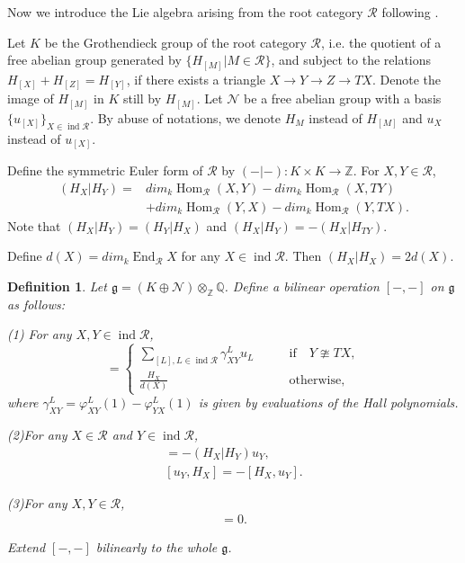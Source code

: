 \documentclass[12pt]{amsart}
\newtheorem{definition}[theorem]{Definition}
\begin{document}
Now we introduce the Lie algebra arising from the root category $\mathcal{R}$ following \cite{1997ROOT}.

   Let $K$ be the Grothendieck group of the root category $\mathcal{R}$, i.e. the quotient of a free abelian group generated by $\{ H_{[M]}| M \in \mathcal{R}\}$, and subject to the relations $H_{[X]}+H_{[Z]}=H_{[Y]}$, if there exists a triangle $X \rightarrow Y \rightarrow Z \rightarrow TX$.
Denote the image of $H_{[M]}$ in $K$ still by $H_{[M]}$.
Let $\mathcal{N}$ be a free abelian group with a basis $\{ u_{[X]} \}_{X \in \operatorname{ind}\mathcal{R}}$. 
By abuse of notations, we denote $H_M$ instead of $H_{[M]}$ and $u_X$ instead of $u_{[X]}$.

Define the symmetric Euler form of $\mathcal{R}$ by $( - | - ):K\times K \rightarrow \mathbb{Z}$.
For $X,Y \in \mathcal{R}$, 
\begin{align*}
(H_X|H_Y)=&dim_k \operatorname{Hom}_{\mathcal{R}}(X,Y)-dim_k \operatorname{Hom}_{\mathcal{R}}(X,TY)\\
        &+dim_k \operatorname{Hom}_{\mathcal{R}}(Y,X)-dim_k \operatorname{Hom}_{\mathcal{R}}(Y,TX).
\end{align*}
Note that $(H_X|H_Y)=(H_Y|H_X)$ and $(H_X|H_Y)=-(H_X|H_{TY})$. 

Define $d(X)=dim_k \operatorname{End}_{\mathcal{R}}X$ for any $X\in \operatorname{ind}\mathcal{R}$. 
Then $(H_X|H_X)=2d(X)$.


\begin{definition}\label{PXg}
    Let $\mathfrak{g}=(K\oplus \mathcal{N}) \otimes_{\mathbb{Z}} \mathbb{Q}$. Define a bilinear operation $[-,-]$ on $\mathfrak{g}$ as follows:

(1) For any $X,Y \in \operatorname{ind} \mathcal{R}$,
\begin{equation*}
  [u_X,u_Y]=
    \begin{cases}
        \sum\limits_{[L],L \in \operatorname{ind} \mathcal{R}} \gamma^L_{XY} u_L  \qquad &\text{if} \quad Y\ncong TX ,\\
        \frac{H_X}{d(X)}  &\text{otherwise},
    \end{cases}
\end{equation*}
where $\gamma^L_{XY}=\varphi^L_{XY}(1)-\varphi^L_{YX}(1)$ is given by evaluations of the Hall polynomials. 


(2)For any $X \in \mathcal{R}$ and $Y \in \operatorname{ind}\mathcal{R}$,
\begin{align*}
    [H_X,u_Y]=-(H_X|H_Y)u_Y , \\
    [u_Y,H_X]=-[H_X,u_Y].
\end{align*}

(3)For any $X,Y \in \mathcal{R}$,
\begin{align*}
    [H_X,H_Y]=0.
\end{align*}

Extend $[-,-]$ bilinearly to the whole $\mathfrak{g}$.
\end{definition}
\end{document}
